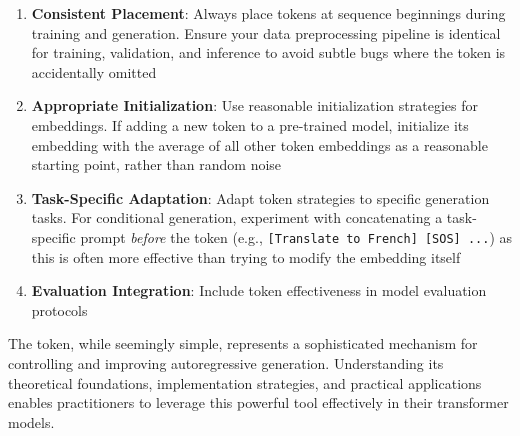 \begin{enumerate}
\item \textbf{Consistent Placement}: Always place \sos{} tokens at sequence beginnings during training and generation. Ensure your data preprocessing pipeline is identical for training, validation, and inference to avoid subtle bugs where the \sos{} token is accidentally omitted
\item \textbf{Appropriate Initialization}: Use reasonable initialization strategies for \sos{} embeddings. If adding a new \sos{} token to a pre-trained model, initialize its embedding with the average of all other token embeddings as a reasonable starting point, rather than random noise
\item \textbf{Task-Specific Adaptation}: Adapt \sos{} token strategies to specific generation tasks. For conditional generation, experiment with concatenating a task-specific prompt \emph{before} the \sos{} token (e.g., \texttt{[Translate to French] [SOS] ...}) as this is often more effective than trying to modify the \sos{} embedding itself
\item \textbf{Evaluation Integration}: Include \sos{} token effectiveness in model evaluation protocols
\end{enumerate}

The \sos{} token, while seemingly simple, represents a sophisticated mechanism for controlling and improving autoregressive generation. Understanding its theoretical foundations, implementation strategies, and practical applications enables practitioners to leverage this powerful tool effectively in their transformer models.